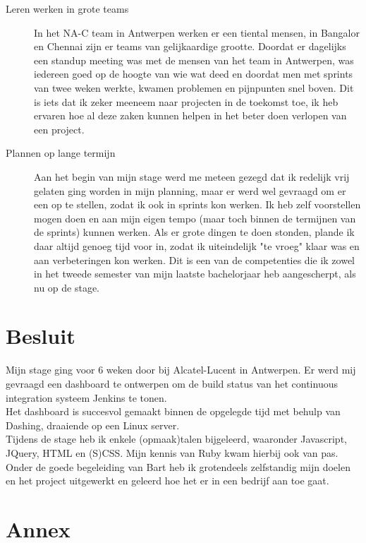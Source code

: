 \documentclass[10pt,a4paper]{article}
\begin{document}
\begin{itemize}
\begin{description}
\item[Leren werken in grote teams] In het NA-C team in Antwerpen werken er een tiental mensen, in Bangalor en Chennai zijn er teams van gelijkaardige grootte. Doordat er dagelijks een standup meeting was met de mensen van het team in Antwerpen, was iedereen goed op de hoogte van wie wat deed en doordat men met sprints van twee weken werkte, kwamen problemen en pijnpunten snel boven. Dit is iets dat ik zeker meeneem naar projecten in de toekomst toe, ik heb ervaren hoe al deze zaken kunnen helpen in het beter doen verlopen van een project.
\item[Plannen op lange termijn] Aan het begin van mijn stage werd me meteen gezegd dat ik redelijk vrij gelaten ging worden in mijn planning, maar er werd wel gevraagd om er een op te stellen, zodat ik ook in sprints kon werken. Ik heb zelf voorstellen mogen doen en aan mijn eigen tempo (maar toch binnen de termijnen van de sprints) kunnen werken. Als er grote dingen te doen stonden, plande ik daar altijd genoeg tijd voor in, zodat ik uiteindelijk "te vroeg" klaar was en aan verbeteringen kon werken. Dit is een van de competenties die ik zowel in het tweede semester van mijn laatste bachelorjaar heb aangescherpt, als nu op de stage.  
\end{description}
\end{itemize}

\section{Besluit}
\label{besluit}
Mijn stage ging voor 6 weken door bij Alcatel-Lucent in Antwerpen. Er werd mij gevraagd een dashboard te ontwerpen om de build status van het continuous integration systeem Jenkins te tonen.\\
Het dashboard is succesvol gemaakt binnen de opgelegde tijd met behulp van Dashing, draaiende op een Linux server.\\
Tijdens de stage heb ik enkele (opmaak)talen bijgeleerd, waaronder Javascript, JQuery, HTML en (S)CSS. Mijn kennis van Ruby kwam hierbij ook van pas.\\
Onder de goede begeleiding van Bart heb ik grotendeels zelfstandig mijn doelen en het project uitgewerkt en geleerd hoe het er in een bedrijf aan toe gaat.

\clearpage

\section{Annex}
\label{annex}
\end{document}
